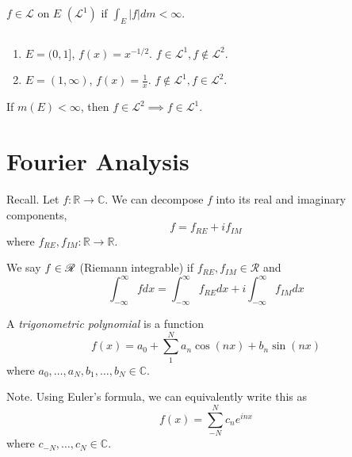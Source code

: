 \documentclass[11pt]{article}
\begin{document}
\begin{remark} $f \in \mathscr{L}$ on $E$ $(\mathscr{L}^1)$ if $\int_E |f| dm < \infty$.
\end{remark}

\begin{example} $\text{}$
  \begin{enumerate}
  \item $E = (0, 1]$, $f(x) = x^{-1/2}$. $f \in \mathscr{L}^1, f \notin \mathscr{L}^2$.
  \item $E = (1, \infty)$, $f(x) = \frac{1}{x}$. $f \notin \mathscr{L}^1, f \in \mathscr{L}^2$.
  \end{enumerate}
\end{example}

\begin{theorem} If $m(E) < \infty$, then $f \in \mathscr{L}^2 \implies f \in \mathscr{L}^1$.
\end{theorem}

\section{Fourier Analysis}

Recall. Let $f: \mathbb{R} \to \mathbb{C}$. We can decompose $f$ into its real and imaginary components, $$f = f_{RE} + i f_{IM}$$where $f_{RE}, f_{IM}: \mathbb{R} \to \mathbb{R}$.

We say $f \in \mathscr{R}$ (Riemann integrable) if $f_{RE}, f_{IM} \in \mathscr{R}$ and $$\int_{- \infty}^\infty f dx = \int_{- \infty}^\infty f_{RE} dx + i \int_{-\infty}^\infty f_{IM} dx$$

\begin{definition} A \emph{trigonometric polynomial} is a function $$f(x) = a_0 + \sum_1^N a_n \cos (nx) + b_n \sin (nx)$$ where $a_0, \dots, a_N, b_1, \dots, b_N \in \mathbb{C}$.
\end{definition}

Note. Using Euler's formula, we can equivalently write this as $$f(x) = \sum_{-N}^N c_n e^{inx}$$ where $c_{-N}, \dots, c_N \in \mathbb{C}$. 
  
\end{document}
